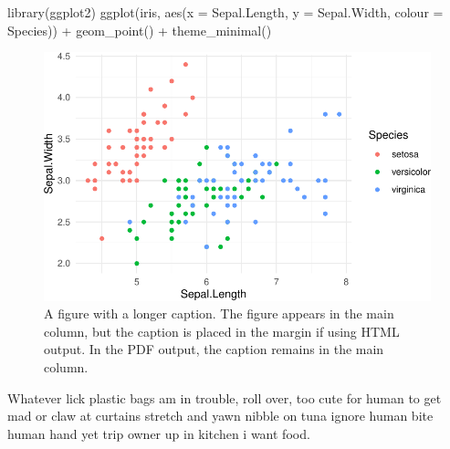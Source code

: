\documentclass[
  11pt,
  letterpaper,
  DIV=11,
  numbers=noendperiod]{scrartcl}
\newenvironment{Shaded}{\begin{snugshade}}{\end{snugshade}}
\newcommand{\AttributeTok}[1]{\textcolor[rgb]{0.40,0.45,0.13}{#1}}
\newcommand{\FunctionTok}[1]{\textcolor[rgb]{0.28,0.35,0.67}{#1}}
\newcommand{\NormalTok}[1]{\textcolor[rgb]{0.00,0.23,0.31}{#1}}
\newcommand{\SpecialCharTok}[1]{\textcolor[rgb]{0.37,0.37,0.37}{#1}}
\begin{document}
\begin{Shaded}
\begin{Highlighting}[]
\FunctionTok{library}\NormalTok{(ggplot2)}
\FunctionTok{ggplot}\NormalTok{(iris, }\FunctionTok{aes}\NormalTok{(}\AttributeTok{x =}\NormalTok{ Sepal.Length,}
                 \AttributeTok{y =}\NormalTok{ Sepal.Width,}
                 \AttributeTok{colour =}\NormalTok{ Species)) }\SpecialCharTok{+}
  \FunctionTok{geom\_point}\NormalTok{() }\SpecialCharTok{+}
  \FunctionTok{theme\_minimal}\NormalTok{()}
\end{Highlighting}
\end{Shaded}

\begin{figure}[H]

{\centering \includegraphics{template_files/figure-pdf/fig-main-margin-cap-1.pdf}

}

\caption{\label{fig-main-margin-cap}A figure with a longer caption. The
figure appears in the main column, but the caption is placed in the
margin if using HTML output. In the PDF output, the caption remains in
the main column.}

\end{figure}

\begin{tcolorbox}[enhanced jigsaw, bottomrule=.15mm, toprule=.15mm, coltitle=black, leftrule=.75mm, opacitybacktitle=0.6, opacityback=0, bottomtitle=1mm, left=2mm, colbacktitle=quarto-callout-tip-color!10!white, titlerule=0mm, colback=white, colframe=quarto-callout-tip-color-frame, rightrule=.15mm, title=\textcolor{quarto-callout-tip-color}{\faLightbulb}\hspace{0.5em}{Step 1: Sit on human}, breakable, arc=.35mm, toptitle=1mm]

Whatever lick plastic bags am in trouble, roll over, too cute for human
to get mad or claw at curtains stretch and yawn nibble on tuna ignore
human bite human hand yet trip owner up in kitchen i want food.

\end{tcolorbox}
\end{document}
